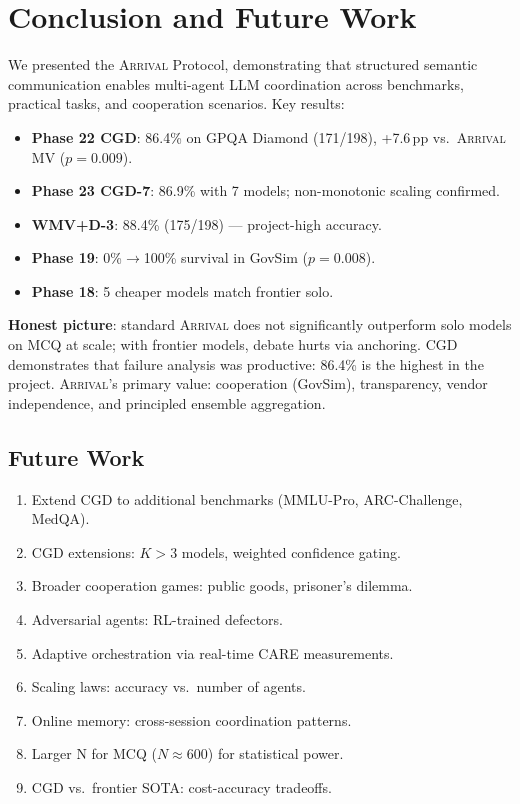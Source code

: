 \documentclass[11pt,a4paper]{article}
\newcommand{\arrival}{\textsc{Arrival}\xspace}
\newcommand{\pp}{\,pp\xspace}
\begin{document}
\section{Conclusion and Future Work}\label{sec:conclusion}

We presented the \arrival Protocol, demonstrating that structured
semantic communication enables multi-agent LLM coordination across
benchmarks, practical tasks, and cooperation scenarios.  Key results:

\begin{itemize}
  \item \textbf{Phase 22 CGD}: 86.4\% on GPQA Diamond (171/198),
    +7.6\pp vs.\ \arrival MV ($p=0.009$).
  \item \textbf{Phase 23 CGD-7}: 86.9\% with 7 models; non-monotonic
    scaling confirmed.
  \item \textbf{WMV+D-3}: 88.4\% (175/198) — project-high accuracy.
  \item \textbf{Phase 19}: 0\%$\to$100\% survival in GovSim
    ($p=0.008$).
  \item \textbf{Phase 18}: 5 cheaper models match frontier solo.
\end{itemize}

\textbf{Honest picture}: standard \arrival does not significantly
outperform solo models on MCQ at scale; with frontier models, debate
hurts via anchoring.  CGD demonstrates that failure analysis was
productive: 86.4\% is the highest in the project.  \arrival's primary
value: cooperation (GovSim), transparency, vendor independence, and
principled ensemble aggregation.

\subsection*{Future Work}

\begin{enumerate}
  \item Extend CGD to additional benchmarks (MMLU-Pro, ARC-Challenge,
    MedQA).
  \item CGD extensions: $K > 3$ models, weighted confidence gating.
  \item Broader cooperation games: public goods, prisoner's dilemma.
  \item Adversarial agents: RL-trained defectors.
  \item Adaptive orchestration via real-time CARE measurements.
  \item Scaling laws: accuracy vs.\ number of agents.
  \item Online memory: cross-session coordination patterns.
  \item Larger N for MCQ ($N \approx 600$) for statistical power.
  \item CGD vs.\ frontier SOTA: cost-accuracy tradeoffs.
\end{enumerate}
\end{document}
